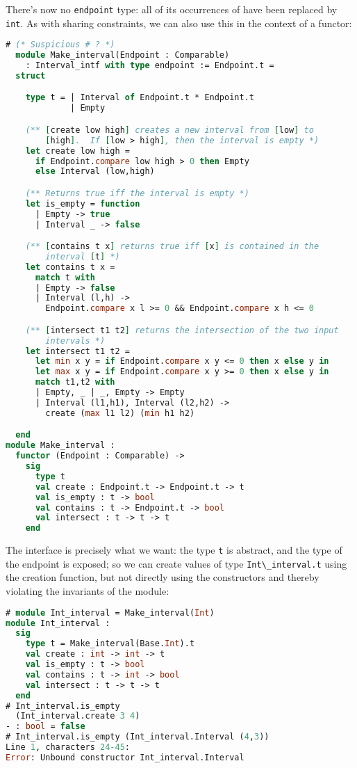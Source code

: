 There's now no \passthrough{\lstinline!endpoint!} type: all of its
occurrences of have been replaced by \passthrough{\lstinline!int!}. As
with sharing constraints, we can also use this in the context of a
functor:

\begin{lstlisting}[language=Caml]
# (* Suspicious # ? *)
  module Make_interval(Endpoint : Comparable)
    : Interval_intf with type endpoint := Endpoint.t =
  struct

    type t = | Interval of Endpoint.t * Endpoint.t
             | Empty

    (** [create low high] creates a new interval from [low] to
        [high].  If [low > high], then the interval is empty *)
    let create low high =
      if Endpoint.compare low high > 0 then Empty
      else Interval (low,high)

    (** Returns true iff the interval is empty *)
    let is_empty = function
      | Empty -> true
      | Interval _ -> false

    (** [contains t x] returns true iff [x] is contained in the
        interval [t] *)
    let contains t x =
      match t with
      | Empty -> false
      | Interval (l,h) ->
        Endpoint.compare x l >= 0 && Endpoint.compare x h <= 0

    (** [intersect t1 t2] returns the intersection of the two input
        intervals *)
    let intersect t1 t2 =
      let min x y = if Endpoint.compare x y <= 0 then x else y in
      let max x y = if Endpoint.compare x y >= 0 then x else y in
      match t1,t2 with
      | Empty, _ | _, Empty -> Empty
      | Interval (l1,h1), Interval (l2,h2) ->
        create (max l1 l2) (min h1 h2)

  end
module Make_interval :
  functor (Endpoint : Comparable) ->
    sig
      type t
      val create : Endpoint.t -> Endpoint.t -> t
      val is_empty : t -> bool
      val contains : t -> Endpoint.t -> bool
      val intersect : t -> t -> t
    end
\end{lstlisting}

The interface is precisely what we want: the type
\passthrough{\lstinline!t!} is abstract, and the type of the endpoint is
exposed; so we can create values of type
\passthrough{\lstinline!Int\_interval.t!} using the creation function,
but not directly using the constructors and thereby violating the
invariants of the module:

\begin{lstlisting}[language=Caml]
# module Int_interval = Make_interval(Int)
module Int_interval :
  sig
    type t = Make_interval(Base.Int).t
    val create : int -> int -> t
    val is_empty : t -> bool
    val contains : t -> int -> bool
    val intersect : t -> t -> t
  end
# Int_interval.is_empty
  (Int_interval.create 3 4)
- : bool = false
# Int_interval.is_empty (Int_interval.Interval (4,3))
Line 1, characters 24-45:
Error: Unbound constructor Int_interval.Interval
\end{lstlisting}

